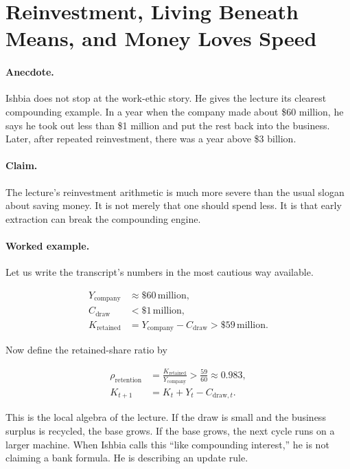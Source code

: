 \section{Reinvestment, Living Beneath Means, and Money Loves Speed}

\paragraph{Anecdote.} Ishbia does not stop at the work-ethic story. He gives the lecture its clearest compounding example. In a year when the company made about \$60 million, he says he took out less than \$1 million and put the rest back into the business. Later, after repeated reinvestment, there was a year above \$3 billion.

\paragraph{Claim.} The lecture's reinvestment arithmetic is much more severe than the usual slogan about saving money. It is not merely that one should spend less. It is that early extraction can break the compounding engine.

\paragraph{Worked example.} Let us write the transcript's numbers in the most cautious way available.

\begin{align}
Y_{\text{company}} &\approx \$60\,\text{million},\\
C_{\text{draw}} &< \$1\,\text{million},\\
K_{\text{retained}} &= Y_{\text{company}} - C_{\text{draw}} > \$59\,\text{million}.
\end{align}

Now define the retained-share ratio by

\begin{align}
\rho_{\text{retention}} &= \frac{K_{\text{retained}}}{Y_{\text{company}}} > \frac{59}{60} \approx 0.983,\\
K_{t+1} &= K_t + Y_t - C_{\text{draw},t}.
\end{align}

This is the local algebra of the lecture. If the draw is small and the business surplus is recycled, the base grows. If the base grows, the next cycle runs on a larger machine. When Ishbia calls this ``like compounding interest,'' he is not claiming a bank formula. He is describing an update rule.

